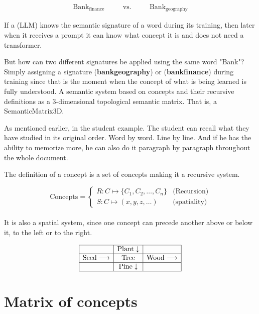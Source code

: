 \documentclass[12pt]{article}
\begin{document}
\[
\begin{array}{rcccl}
	\text{Bank}_{\text{finance}} & \quad & \text{vs.} & \quad & \text{Bank}_{\text{geography}}
\end{array}
\]

If a (LLM) knows the semantic signature of a word during its training, then later when it receives a prompt it can know what concept it is and does not need a transformer.

But how can two different signatures be applied using the same word "Bank"?
Simply assigning a signature (\textbf{bank\textunderscore geography}) or (\textbf{bank\textunderscore finance}) during training since that is the moment when the concept of what is being learned is fully understood.
A semantic system based on concepts and their recursive definitions as a 3-dimensional topological semantic matrix. That is, a SemanticMatrix3D.


As mentioned earlier, in the student example. The student can recall what they have studied in its original order. Word by word. Line by line. And if he has the ability to memorize more, he can also do it paragraph by paragraph throughout the whole document.

The definition of a concept is a set of concepts making it a recursive system.

\[
\text{Concepts} = \begin{cases} 
	R : C \mapsto \{C_1, C_2, \dots, C_n\} & \text{(Recursion)} \\
	S : C \mapsto (x, y, z, \dots) & \text{(spatiality)} 
\end{cases}
\]\\

 It is also a spatial system, since one concept can precede another above or below it, to the left or to the right.
 
$$\begin{array}{|c|c|c|}
	\hline
	& \text{Plant} \downarrow & \\ \hline
	\text{Seed} \longrightarrow & \mathbf{\text{Tree}} & \text{Wood} \longrightarrow \\ \hline
	& \text{Pine} \downarrow & \\ \hline
\end{array}$$



\section{Matrix of concepts}
\end{document}
